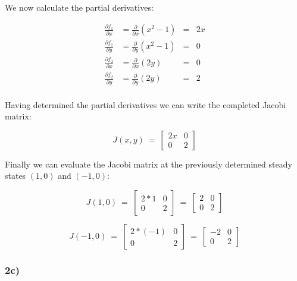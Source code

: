 \documentclass[]{scrartcl}
\begin{document}
We now calculate the partial derivatives:

\begin{center}
\begin{align*}
	\frac{\partial f_1}{\partial x} &= \frac{\partial}{\partial x}(x^2 - 1) &= & 2x \\
	\frac{\partial f_1}{\partial y} &= \frac{\partial}{\partial y}(x^2 - 1) &= & 0 \\
	\frac{\partial f_2}{\partial x} &= \frac{\partial}{\partial x}(2y)	&= & 0 \\
	\frac{\partial f_2}{\partial y} &= \frac{\partial}{\partial y}(2y)	&= & 2 \\
\end{align*}
\end{center}

Having determined the partial derivatives we can write the completed Jacobi matrix:

\[
J(x,y) ~=~
\begin{bmatrix}
  2x & 0 \\[1ex] %
  0 & 2
\end{bmatrix}
\]

Finally we can evaluate the Jacobi matrix at the previously determined steady states $(1,0)$ and $(-1,0)$:

\[
J(1,0) 
~=~
\begin{bmatrix}
  2*1 & 0 \\[1ex] %
  0 & 2
\end{bmatrix}
~=~
\begin{bmatrix}
  2 & 0 \\[1ex] %
  0 & 2
\end{bmatrix}
\]

\[
J(-1,0) 
~=~
\begin{bmatrix}
  2*(-1) & 0 \\[1ex] %
  0 & 2
\end{bmatrix}
~=~
\begin{bmatrix}
  -2 & 0 \\[1ex] %
  0 & 2
\end{bmatrix}
\]



\subsubsection*{2c)}
\end{document}
